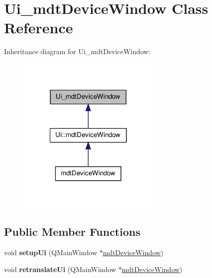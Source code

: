 \hypertarget{class_ui__mdt_device_window}{
\section{Ui\_\-mdtDeviceWindow Class Reference}
\label{class_ui__mdt_device_window}
}


Inheritance diagram for Ui\_\-mdtDeviceWindow:\nopagebreak
\begin{figure}[H]
\begin{center}
\leavevmode
\includegraphics[width=194pt]{class_ui__mdt_device_window__inherit__graph}
\end{center}
\end{figure}
\subsection*{Public Member Functions}
\begin{DoxyCompactItemize}
\item 
\hypertarget{class_ui__mdt_device_window_a0cdedb1dd83eba2873d0c17c529a30ca}{
void {\bfseries setupUi} (QMainWindow $\ast$\hyperlink{classmdt_device_window}{mdtDeviceWindow})}
\label{class_ui__mdt_device_window_a0cdedb1dd83eba2873d0c17c529a30ca}

\item 
\hypertarget{class_ui__mdt_device_window_af16eccf51af471614d5798135a342119}{
void {\bfseries retranslateUi} (QMainWindow $\ast$\hyperlink{classmdt_device_window}{mdtDeviceWindow})}
\label{class_ui__mdt_device_window_af16eccf51af471614d5798135a342119}

\end{DoxyCompactItemize}

